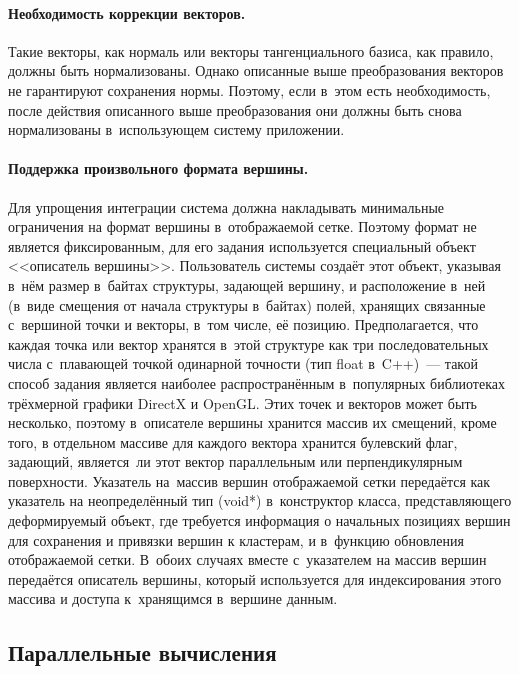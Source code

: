\documentclass[a4paper, 14pt, titlepage]{extarticle}
\newcommand{\eng}[1]{{\English #1}}
\begin{document}
        \paragraph{Необходимость коррекции векторов.}
        Такие векторы, как нормаль или векторы тангенциального базиса, как правило, должны быть
        нормализованы. Однако описанные выше преобразования векторов не гарантируют сохранения
        нормы. Поэтому, если в~этом есть необходимость, после действия описанного выше преобразования
        они должны быть снова нормализованы в~использующем систему приложении.

        \paragraph{Поддержка произвольного формата вершины.}
        Для упрощения интеграции система должна накладывать минимальные ограничения на формат
        вершины в~отображаемой сетке. Поэтому формат не является фиксированным, для его задания
        используется специальный объект <<описатель вершины>>. Пользователь системы создаёт этот
        объект, указывая в~нём размер в~байтах структуры, задающей вершину, и расположение в~ней
        (в~виде смещения от начала структуры в~байтах) полей, хранящих связанные с~вершиной точки и
        векторы, в~том числе, её позицию.  Предполагается, что каждая точка или вектор хранятся
        в~этой структуре как три последовательных числа с~плавающей точкой одинарной точности (тип
        \eng{float} в~C++)~--- такой способ задания является наиболее распространённым в~популярных
        библиотеках трёхмерной графики DirectX и OpenGL. Этих точек и %
        векторов может быть несколько, поэтому в~описателе вершины хранится массив их смещений,
        кроме того, в отдельном массиве для каждого вектора хранится булевский флаг, задающий,
        является~ли этот вектор параллельным или перпендикулярным поверхности. Указатель на~массив
        вершин отображаемой сетки передаётся как указатель на неопределённый тип (void*)
        в~конструктор класса, представляющего деформируемый объект, где требуется информация о
        начальных позициях вершин для сохранения и привязки вершин к кластерам, и в~функцию
        обновления отображаемой сетки. В~обоих случаях вместе с~указателем на массив вершин
        передаётся описатель вершины, который используется для индексирования этого массива и
        доступа к~хранящимся в~вершине данным.

    \subsection{Параллельные вычисления}\label{ssec:parallel}
\end{document}
